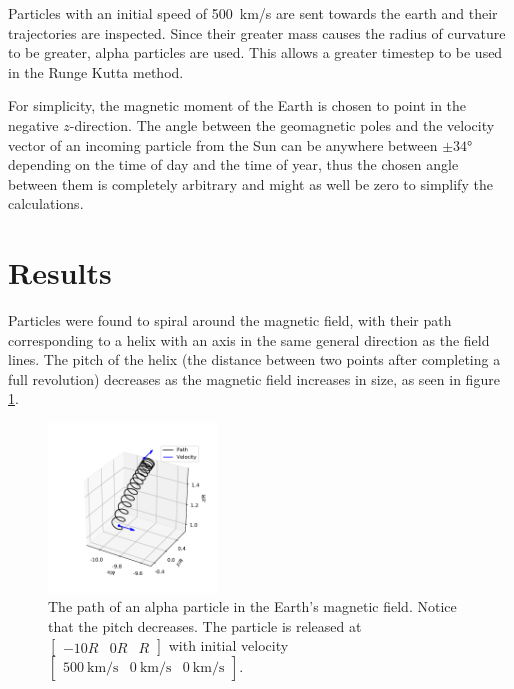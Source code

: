 \documentclass[5p,sort&compress]{elsarticle}
\begin{document}
Particles with an initial speed of \SI{500}{\kilo \meter /\second} are sent towards the earth and their trajectories are inspected. Since their greater mass causes the radius of curvature to be greater, alpha particles are used. This allows a greater timestep to be used in the Runge Kutta method.

For simplicity, the magnetic moment of the Earth is chosen to point in the negative $z$-direction. The angle between the geomagnetic poles and the velocity vector of an incoming particle from the Sun can be anywhere between $\pm \ang{34}$ depending on the time of day and the time of year, thus the chosen angle between them is completely arbitrary and might as well be zero to simplify the calculations.

\section{Results}
Particles were found to spiral around the magnetic field, with their path corresponding to a helix with an axis in the same general direction as the field lines. The pitch of the helix (the distance between two points after completing a full revolution) decreases as the magnetic field increases in size, as seen in figure \ref{fig:helical1}.

\begin{figure}[h]
    \centering
    \includegraphics[width=0.4\textwidth]{figure1.pdf}
    \caption{The path of an alpha particle in the Earth's magnetic field. Notice that the pitch decreases. The particle is released at $\begin{bmatrix} -10R&0R&R \end{bmatrix}$ with initial velocity $\begin{bmatrix} \SI{500}{\kilo \meter /\second}&\SI{0}{\kilo \meter /\second}&\SI{0}{\kilo \meter /\second} \end{bmatrix}$.}
    \label{fig:helical1}
\end{figure}
\end{document}
